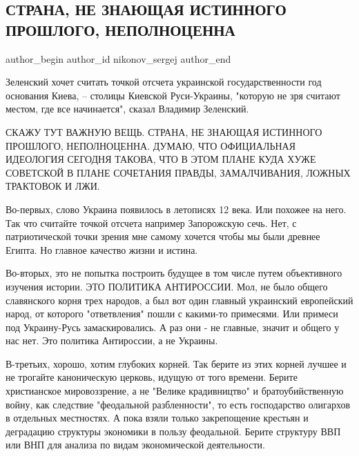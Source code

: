  
 
 
 
 
 
\subsection{СТРАНА, НЕ ЗНАЮЩАЯ ИСТИННОГО ПРОШЛОГО, НЕПОЛНОЦЕННА}
\label{sec:25_08_2021.fb.nikonov_sergej.1.strana_proshloje_nepolnocennost}
 
\ifcmt
 author_begin
   author_id nikonov_sergej
 author_end
\fi

Зеленский хочет считать точкой отсчета украинской государственности год
основания Киева, – столицы Киевской Руси-Украины, "которую не зря считают
местом, где все начинается", сказал Владимир Зеленский. 

СКАЖУ ТУТ ВАЖНУЮ ВЕЩЬ. СТРАНА, НЕ ЗНАЮЩАЯ ИСТИННОГО ПРОШЛОГО, НЕПОЛНОЦЕННА.
ДУМАЮ, ЧТО ОФИЦИАЛЬНАЯ ИДЕОЛОГИЯ СЕГОДНЯ ТАКОВА, ЧТО В ЭТОМ ПЛАНЕ КУДА ХУЖЕ
СОВЕТСКОЙ В ПЛАНЕ СОЧЕТАНИЯ ПРАВДЫ, ЗАМАЛЧИВАНИЯ, ЛОЖНЫХ ТРАКТОВОК И ЛЖИ. 

Во-первых, слово Украина появилось в летописях 12 века. Или похожее на него.
Так что считайте точкой отсчета например Запорожскую сечь. Нет, с
патриотической точки зрения мне самому хочется чтобы мы были древнее Египта. Но
главное качество жизни и истина.

Во-вторых, это не попытка построить будущее в том числе путем объективного
изучения истории. ЭТО ПОЛИТИКА АНТИРОССИИ. Мол, не было общего славянского
корня трех народов, а был вот один главный  украинский европейский народ, от
которого "ответвления" пошли с какими-то примесями. Или примеси под
Украину-Русь замаскировались.  А раз они - не главные, значит и общего у нас
нет. Это политика Антироссии, а не Украины. 

В-третьих, хорошо, хотим глубоких корней. Так берите из этих корней лучшее и не
трогайте каноническую церковь, идущую от того времени. Берите христианское
мировоззрение, а не "Велике крадивництво" и братоубийственную  войну, как
следствие "феодальной разбленности", то есть господарство олигархов в отдельных
местностях. А пока взяли только закрепощение крестьян и деградацию структуры
экономики в пользу феодальной. Берите структуру ВВП или ВНП для анализа по
видам экономической деятельности. 

